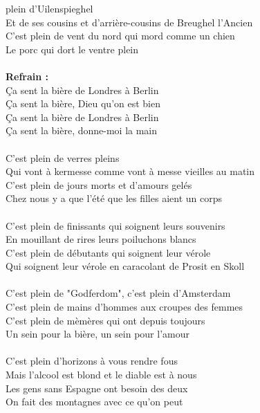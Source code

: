 
 plein d'Uilenspieghel
\\Et de ses cousins et d'arrière-cousins de Breughel l'Ancien
\\C'est plein de vent du nord qui mord comme un chien
\\Le porc qui dort le ventre plein
\\\\\textbf{Refrain :}
\\Ça sent la bière de Londres à Berlin
\\Ça sent la bière, Dieu qu'on est bien
\\Ça sent la bière de Londres à Berlin
\\Ça sent la bière, donne-moi la main
\\\\C'est plein de verres pleins
\\Qui vont à kermesse comme vont à messe vieilles au matin
\\C'est plein de jours morts et d'amours gelés
\\Chez nous y a que l'été que les filles aient un corps
\\\\C'est plein de finissants qui soignent leurs souvenirs
\\En mouillant de rires leurs poiluchons blancs
\\C'est plein de débutants qui soignent leur vérole
\\Qui soignent leur vérole en caracolant de Prosit en Skoll
\\\\C'est plein de "Godferdom", c'est plein d'Amsterdam
\\C'est plein de mains d'hommes aux croupes des femmes
\\C'est plein de mèmères qui ont depuis toujours
\\Un sein pour la bière, un sein pour l'amour
\\\\C'est plein d'horizons à vous rendre fous
\\Mais l'alcool est blond et le diable est à nous
\\Les gens sans Espagne ont besoin des deux
\\On fait des montagnes avec ce qu'on peut
\\
\breakpage